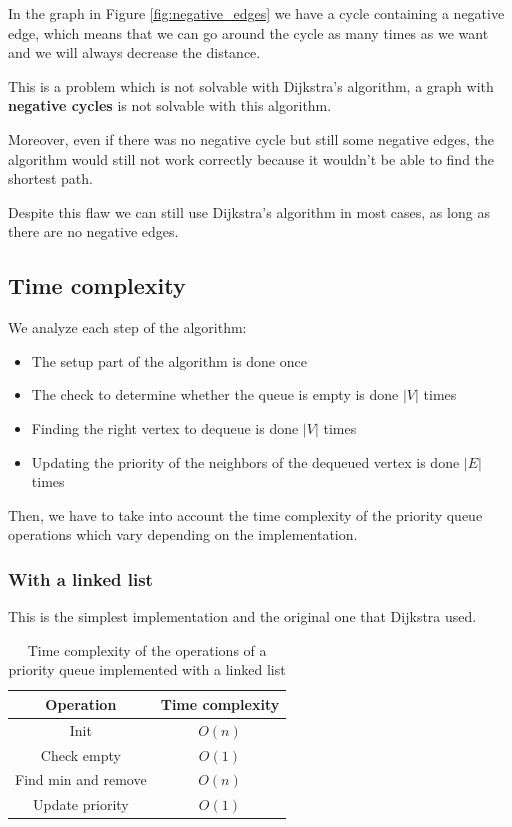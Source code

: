 \documentclass[12pt]{extarticle}
\begin{document}
In the graph in Figure \ref{fig:negative_edges} we have a cycle containing a negative edge, which means that we can go around the cycle as many times as we want and we will always decrease the distance.

This is a problem which is not solvable with Dijkstra's algorithm, a graph with \textbf{negative cycles} is not solvable with this algorithm.

Moreover, even if there was no negative cycle but still some negative edges, the algorithm would still not work correctly because it wouldn't be able to find the shortest path.

Despite this flaw we can still use Dijkstra's algorithm in most cases, as long as there are no negative edges.

\subsection{Time complexity}

We analyze each step of the algorithm:

\begin{itemize}
    \item The setup part of the algorithm is done once
    \item The check to determine whether the queue is empty is done $|V|$ times
    \item Finding the right vertex to dequeue is done $|V|$ times
    \item Updating the priority of the neighbors of the dequeued vertex is done $|E|$ times
\end{itemize}

Then, we have to take into account the time complexity of the priority queue operations which vary depending on the implementation.

\subsubsection{With a linked list}

This is the simplest implementation and the original one that Dijkstra used.

\begin{table}[H]
    \centering
    \begin{tabular}{|c|c|}
        \hline
        \textbf{Operation}  & \textbf{Time complexity} \\
        \hline
        Init                & $O(n)$                   \\
        Check empty         & $O(1)$                   \\
        Find min and remove & $O(n)$                   \\
        Update priority     & $O(1)$                   \\
        \hline
    \end{tabular}
    \caption{Time complexity of the operations of a priority queue implemented with a linked list}
    \label{tab:priorityqueue_linkedlist}
\end{table}
\end{document}
